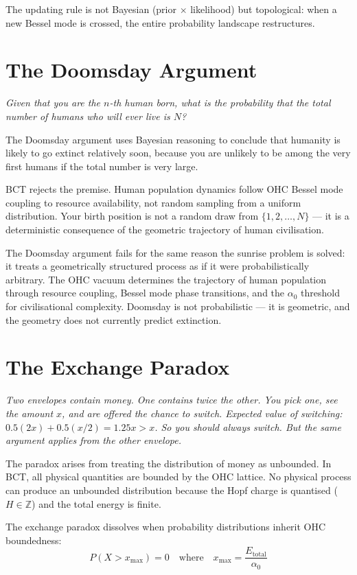 \documentclass[aps,prl,twocolumn,superscriptaddress]{revtex4-2}
\begin{document}
The updating rule is not Bayesian (prior $\times$ likelihood) but topological: when a new Bessel mode is crossed, the entire probability landscape restructures.

\section{The Doomsday Argument}

\emph{Given that you are the $n$-th human born, what is the probability that the total number of humans who will ever live is $N$?}

The Doomsday argument uses Bayesian reasoning to conclude that humanity is likely to go extinct relatively soon, because you are unlikely to be among the very first humans if the total number is very large.

BCT rejects the premise. Human population dynamics follow OHC Bessel mode coupling to resource availability, not random sampling from a uniform distribution. Your birth position is not a random draw from $\{1, 2, \ldots, N\}$ --- it is a deterministic consequence of the geometric trajectory of human civilisation.

The Doomsday argument fails for the same reason the sunrise problem is solved: it treats a geometrically structured process as if it were probabilistically arbitrary. The OHC vacuum determines the trajectory of human population through resource coupling, Bessel mode phase transitions, and the $\alpha_0$ threshold for civilisational complexity. Doomsday is not probabilistic --- it is geometric, and the geometry does not currently predict extinction.

\section{The Exchange Paradox}

\emph{Two envelopes contain money. One contains twice the other. You pick one, see the amount $x$, and are offered the chance to switch. Expected value of switching: $0.5(2x) + 0.5(x/2) = 1.25x > x$. So you should always switch. But the same argument applies from the other envelope.}

The paradox arises from treating the distribution of money as unbounded. In BCT, all physical quantities are bounded by the OHC lattice. No physical process can produce an unbounded distribution because the Hopf charge is quantised ($H \in \mathbb{Z}$) and the total energy is finite.

The exchange paradox dissolves when probability distributions inherit OHC boundedness:
\begin{equation}
P(X > x_{\mathrm{max}}) = 0 \quad \text{where} \quad x_{\mathrm{max}} = \frac{E_{\mathrm{total}}}{\alpha_0}
\end{equation}
\end{document}
